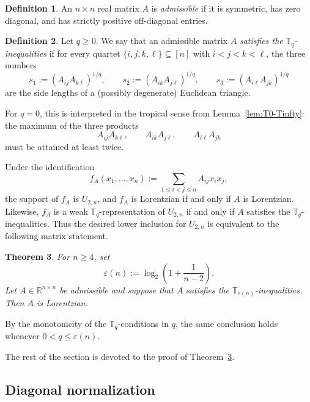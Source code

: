 \documentclass[12pt]{amsart}
\newtheorem{theorem}{Theorem}[section]
\theoremstyle{definition}
\newtheorem{definition}[theorem]{Definition}
\newcommand{\1}{\mathbf{1}}
\DeclareMathOperator{\upR}{R}   %
\newcommand\R{{\mathbb R}}
\newcommand\T{{\mathbb T}}
\newcommand\ol{\texorpdfstring{\textbf{Oliver:} }{Oliver: }}
\begin{document}
\begin{definition}
An $n\times n$ real matrix $A$ is \emph{admissible} if it is symmetric, has zero
diagonal, and has strictly positive off-diagonal entries.
\end{definition}

\begin{definition}
Let $q\ge 0$. We say that an admissible matrix $A$ \emph{satisfies the
$\T_q$-inequalities} if for every quartet $\{i,j,k,\ell\}\subseteq [n]$ with
$i<j<k<\ell$, the three numbers
\[
s_1 := (A_{ij}A_{k\ell})^{1/q},\qquad
s_2 := (A_{ik}A_{j\ell})^{1/q},\qquad
s_3 := (A_{i\ell}A_{jk})^{1/q}
\]
are the side lengths of a (possibly degenerate) Euclidean triangle.
\end{definition}

For $q=0$, this is interpreted in the tropical sense from
Lemma~\ref{lem:T0-Tinfty}: the maximum of the three products
\[
A_{ij}A_{k\ell},\qquad A_{ik}A_{j\ell},\qquad A_{i\ell}A_{jk}
\]
must be attained at least twice.

Under the identification
\[
f_A(x_1,\dots,x_n):=\sum_{1\le i<j\le n} A_{ij}x_ix_j,
\]
the support of $f_A$ is $U_{2,n}$, and $f_A$ is Lorentzian if and only if $A$ is
Lorentzian. Likewise, $f_A$ is a weak $\T_q$-representation of $U_{2,n}$ if and only
if $A$ satisfies the $\T_q$-inequalities. Thus the desired lower inclusion for
$U_{2,n}$ is equivalent to the following matrix statement.

\begin{theorem}
\label{thm:rank-two-uniform}
For $n\ge 4$, set
\[
\varepsilon(n):=\log_2\!\left(1+\frac{1}{n-2}\right).
\]
Let $A\in \R^{n\times n}$ be admissible and suppose that $A$ satisfies the
$\T_{\varepsilon(n)}$-inequalities. Then $A$ is Lorentzian.
\end{theorem}

By the monotonicity of the $\T_q$-conditions in $q$, the same conclusion holds
whenever $0<q\le \varepsilon(n)$.


The rest of the section is devoted to the proof of
Theorem~\ref{thm:rank-two-uniform}.

\subsection{Diagonal normalization}
\end{document}
